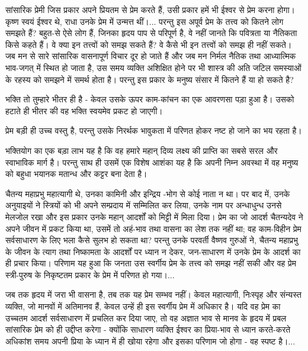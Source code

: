 सांसारिक प्रेमी जिस प्रकार अपने प्रियतम से प्रेम करते हैं, उसी प्रकार हमें भी ईश्वर से प्रेम करना होगा। कृष्ण स्वयं ईश्वर थे, राधा उनके प्रेम में उन्मत्त थीं।... परन्तु इस अपूर्व प्रेम के तत्त्व को कितने लोग समझते हैं? बहुत-से ऐसे लोग हैं, जिनका हृदय पाप से परिपूर्ण है, वे नहीं जानते कि पवित्रता या नैतिकता किसे कहते हैं। वे क्या इन तत्त्वों को समझ सकते हैं? वे कैसे भी इन तत्त्वों को समझ ही नहीं सकते। जब मन से सारे सांसारिक वासनापूर्ण विचार दूर हो जाते हैं और जब मन निर्मल नैतिक तथा आध्यात्मिक भाव-जगत् में स्थित हो जाता है, उस समय व्यक्ति अशिक्षित होने पर भी शास्त्र की अति जटिल समस्याओं के रहस्य को समझने में समर्थ होता है। परन्तु इस प्रकार के मनुष्य संसार में कितने हैं या हो सकते है? 

भक्ति तो तुम्हारे भीतर ही है - केवल उसके ऊपर काम-कांचन का एक आवरणसा पड़ा हुआ है। उसको हटाते ही भीतर की वह भक्ति स्वयमेव प्रकट हो जाएगी। 

प्रेम बड़ी ही उच्च वस्तु है, परन्तु उसके निरर्थक भावुकता में परिणत होकर नष्ट हो जाने का भय रहता है। 

भक्तियोग का एक बड़ा लाभ यह है कि वह हमारे महान् दिव्य लक्ष्य की प्राप्ति का सबसे सरल और स्वाभाविक मार्ग है। परन्तु साथ ही उसमें एक विशेष आशंका यह है कि अपनी निम्न अवस्था में वह मनुष्य को बहुधा भयानक मतान्ध और कट्टर बना देता है। 

\newpage

चैतन्य महाप्रभु महात्यागी थे, उनका कामिनी और इन्द्रिय -भोग से कोई नाता न था। पर बाद में, उनके अनुयाइयों ने स्त्रियों को भी अपने सम्प्रदाय में सम्मिलित कर लिया, उनके नाम पर अन्धाधुन्ध उनसे मेलजोल रखा और इस प्रकार उनके महान् आदर्शों को मिट्टी में मिला दिया। प्रेम का जो आदर्श चैतन्यदेव ने अपने जीवन में प्रकट किया था, उसमें तो अहं-भाव तथा वासना का लेश तक नहीं था; वह काम-विहीन प्रेम सर्वसाधारण के लिए भला कैसे सुलभ हो सकता था? परन्तु उनके परवर्ती वैष्णव गुरुओं ने, चैतन्य महाप्रभु के जीवन के त्याग तथा निष्कामता के आदर्शों पर ध्यान न देकर, जन-साधारण में उनके प्रेम के आदर्श का ही प्रचार किया। परिणाम यह हुआ कि जनता उस स्वर्गीय प्रेम के तत्त्व को समझ नहीं सकी और वह प्रेम स्त्री-पुरुष के निकृष्टतम प्रकार के प्रेम में परिणत हो गया।... 

जब तक हृदय में जरा भी वासना है, तब तक यह प्रेम सम्भव नहीं। केवल महात्यागी, निःस्पृह और संन्यस्त व्यक्ति, जो मानवों में अतिमानव हैं, केवल उन्हें ही इस स्वर्गीय प्रेम में अधिकार है। यदि वह प्रेम का उच्चतम आदर्श सर्वसाधारण में प्रचलित कर दिया जाए, तो वह अज्ञात भाव से मानव के हृदय में प्रबल सांसारिक प्रेम को ही उद्दीप्त करेगा - क्योंकि साधारण व्यक्ति ईश्वर का प्रिया-भाव से ध्यान करते-करते अधिकांश समय अपनी प्रिया के ध्यान में ही खोया रहेगा और इसका परिणाम जो होगा - वह स्पष्ट है।... 

